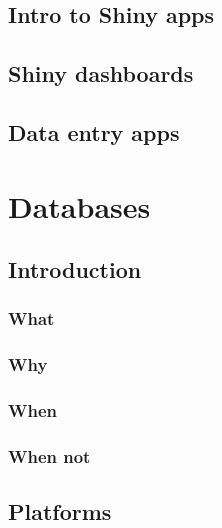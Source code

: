 \documentclass[
]{book}
\begin{document}
\hypertarget{intro-to-shiny-apps}{%
\chapter{Intro to Shiny apps}\label{intro-to-shiny-apps}}

\hypertarget{shiny-dashboards}{%
\chapter{Shiny dashboards}\label{shiny-dashboards}}

\hypertarget{data-entry-apps}{%
\chapter{Data entry apps}\label{data-entry-apps}}

\hypertarget{part-databases}{%
\part{Databases}\label{part-databases}}

\hypertarget{introduction}{%
\chapter{Introduction}\label{introduction}}

\hypertarget{what}{%
\section{What}\label{what}}

\hypertarget{why}{%
\section{Why}\label{why}}

\hypertarget{when}{%
\section{When}\label{when}}

\hypertarget{when-not}{%
\section{When not}\label{when-not}}

\hypertarget{platforms}{%
\chapter{Platforms}\label{platforms}}
\end{document}
